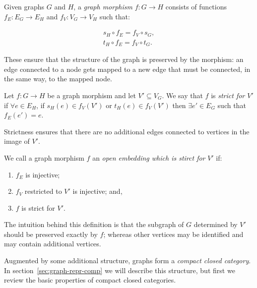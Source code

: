 \documentclass[runningheads]{llncs}
\begin{document}
Given graphs $G$ and $H$, a \emph{graph morphism} $f : G\to H$
consists of functions $f_E : E_G \to E_H$ and $f_V:V_G\to V_H$ such
that:

\begin{gather}
  s_H\circ f_E = f_V \circ s_G,\label{eq:graph-hom1}\\
  t_H\circ f_E = f_V \circ t_G\label{eq:graph-hom2}.
\end{gather}

\noindent These ensure that the structure of the graph is preserved by
the morphism: an edge connected to a node gets mapped to a new edge
that must be connected, in the same way, to the mapped node.


\begin{definition}
  Let $f: G \to H$ be a graph morphism and let $V' \subseteq V_G$. We
  say that $f$ is \emph{strict for $V'$} if $\forall e \in E_H$, if
  $s_H(e) \in f_V(V')$ or $t_H(e) \in f_V(V')$ then $\exists e' \in
  E_G$ such that $f_E(e') = e$.
\end{definition}
\noindent Strictness ensures that there are no additional
edges connected to vertices in the image of $V'$.

\begin{definition}
\label{open-embedding-def}
We call a graph morphism $f$ an \emph{open embedding which is stirct for} $V'$ if:
\begin{enumerate}
\item $f_E$ is injective;
\item $f_V$ restricted to $V'$ is injective; and,
\item $f$ is strict for $V'$.
\end{enumerate}
\end{definition}

\noindent The intuition behind this definition is that the subgraph of
$G$ determined by $V'$ should be preserved exactly by $f$; 
whereas other vertices may be identified and may contain additional
vertices.

Augmented by some additional structure, graphs form a \emph{compact closed
category}.  In section~\ref{sec:graph-repr-comp} we will describe this
structure, but first we review the basic properties of compact closed
categories.
\end{document}
